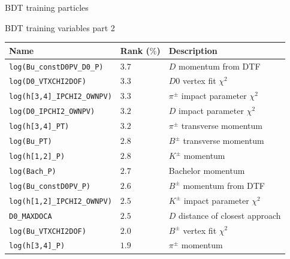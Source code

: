 \documentclass{beamer}
\begin{document}
\begin{frame}{BDT training particles}
  \begin{center}
    BDT training variables part 2
  \end{center}
  \centering
  \begin{tabular}{|l|l|l|}
    \hline
    Name & Rank ($\%$) & Description \\
    \hline
    \texttt{log(Bu\_constD0PV\_D0\_P)} & $3.7$ & $D$ momentum from DTF \\
    \texttt{log(D0\_VTXCHI2DOF)} & $3.3$ & $D0$ vertex fit $\chi^2$ \\
    \texttt{log(h[3,4]\_IPCHI2\_OWNPV)} & $3.3$ & $\pi^\pm$ impact parameter $\chi^2$ \\
    \texttt{log(D0\_IPCHI2\_OWNPV)} & $3.2$ & $D$ impact parameter $\chi^2$ \\
    \texttt{log(h[3,4]\_PT)} & $3.2$ & $\pi^\pm$ transverse momentum \\
    \texttt{log(Bu\_PT)} & $2.8$ & $B^\pm$ transverse momentum \\
    \texttt{log(h[1,2]\_P)} & $2.8$ & $K^\pm$ momentum \\
    \texttt{log(Bach\_P)} & $2.7$ & Bachelor momentum \\
    \texttt{log(Bu\_constD0PV\_P)} & $2.6$ & $B^\pm$ momentum from DTF \\
    \texttt{log(h[1,2]\_IPCHI2\_OWNPV)} & $2.5$ & $K^\pm$ impact parameter $\chi^2$ \\
    \texttt{D0\_MAXDOCA} & $2.5$ & $D$ distance of closest approach \\
    \texttt{log(Bu\_VTXCHI2DOF)} & $2.0$ & $B^\pm$ vertex fit $\chi^2$ \\
    \texttt{log(h[3,4]\_P)} & $1.9$ & $\pi^\pm$ momentum \\
    \hline
  \end{tabular}
\end{frame}
\end{document}
